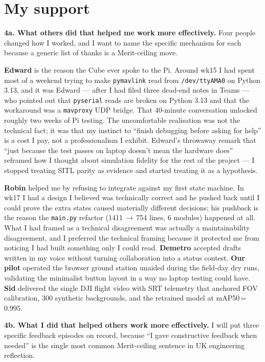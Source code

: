 \section{My support}

\textbf{4a. What others did that helped me work more effectively.} Four people changed how I worked, and I want to name the specific mechanism for each because a generic list of thanks is a Merit-ceiling move.

\textbf{Edward} is the reason the Cube ever spoke to the Pi. Around wk15 I had spent most of a weekend trying to make \texttt{pymavlink} read from \texttt{/dev/ttyAMA0} on Python 3.13, and it was Edward --- after I had filed three dead-end notes in Teams --- who pointed out that \texttt{pyserial} reads are broken on Python 3.13 and that the workaround was a \texttt{mavproxy} UDP bridge. That 40-minute conversation unlocked roughly two weeks of Pi testing. The uncomfortable realisation was not the technical fact; it was that my instinct to ``finish debugging before asking for help'' is a cost I pay, not a professionalism I exhibit. Edward's throwaway remark that ``just because the test passes on laptop doesn't mean the hardware does'' reframed how I thought about simulation fidelity for the rest of the project --- I stopped treating SITL parity as evidence and started treating it as a hypothesis.

\textbf{Robin} helped me by refusing to integrate against my first state machine. In wk17 I had a design I believed was technically correct and he pushed back until I could prove the extra states caused materially different decisions; his pushback is the reason the \texttt{main.py} refactor (1411\,$\to$\,754 lines, 6 modules) happened at all. What I had framed as a technical disagreement was actually a maintainability disagreement, and I preferred the technical framing because it protected me from noticing I had built something only I could read. \textbf{Demetro} accepted drafts written in my voice without turning collaboration into a status contest. \textbf{Our pilot} operated the browser ground station unaided during the field-day dry runs, validating the minimalist button layout in a way no laptop testing could have. \textbf{Sid} delivered the single DJI flight video with SRT telemetry that anchored FOV calibration, 300 synthetic backgrounds, and the retrained model at mAP50\,=\,0.995.

\textbf{4b. What I did that helped others work more effectively.} I will put three specific feedback episodes on record, because ``I gave constructive feedback when needed'' is the single most common Merit-ceiling sentence in UK engineering reflection.

